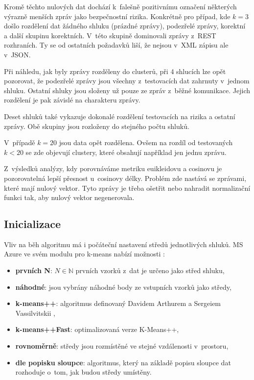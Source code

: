 \documentclass[thesis=M,czech]{FITthesis}[2012/10/20]
\begin{document}
			Kromě těchto nulových dat dochází k~falešně pozitivnímu označení některých výrazně menších zpráv jako bezpečnostní rizika. Konkrétně pro případ, kde $k = 3$ došlo rozdělení dat žádného shluku (prázdné zprávy), podezřelé zprávy, korektní a další skupinu korektních. V~této skupině dominovali zprávy z~REST rozhraních. Ty se od ostatních požadavků liší, že nejsou v~XML zápisu ale v~JSON.
			
			Při náhledu, jak byly zprávy rozděleny do clusterů, při 4 shlucích lze opět pozorovat, že podezřelé zprávy jsou všechny z~testovacích dat zahrnuty v~jednom shluku. Ostatní shluky jsou složeny už pouze ze zpráv z~běžné komunikace. Jejich rozdělení je pak závislé na charakteru zprávy.
			
			Deset shluků také vykazuje dokonalé rozdělení testovacích na rizika a ostatní zprávy. Obě skupiny jsou rozloženy do stejného počtu shluků.
			
			V~případě $ k = 20$ jsou data opět rozdělena. Ovšem na rozdíl od testovaných $k < 20$ se zde objevují clustery, které obsahují například jen jednu zprávu. 
			
			Z~výsledků analýzy, kdy porovnáváme metriku euikleidovu a cosinovu je pozorovatelná lepší přesnost u~cosinovy délky. Problém zde nastává se zprávami, které mají nulový vektor. Tyto zprávy je třeba ošetřit nebo nahradit normalizační funkci tak, aby nulový vektor negenerovala. 			
			
		\subsection{Inicializace}
			Vliv na běh algoritmu má i počáteční nastavení středů jednotlivých shluků. MS Azure ve svém modulu pro k-means nabízí možnosti \cite{MSAzure-kmeans}:
			
			\begin{itemize} 
				\item \textbf{prvních N}: $N \in \mathbb{N} $ prvních vzorků z~dat je určeno jako střed shluku, 
				\item \textbf{náhodné}: jsou vybrány náhodné body ze vstupních vzorků jako středy,
				\item \textbf{k-means++}: algoritmus definovaný Davidem Arthurem a Sergeiem Vassilvitskii \cite{kmeans++},
				\item \textbf{k-means++Fast}: optimalizovaná verze K-Means++,	
				\item \textbf{rovnoměrně}: středy jsou rozmístěné ve stejné vzdálenosti v~prostoru,		
				\item \textbf{dle popisku sloupce}: algoritmus, který na základě popisu sloupce dat rozhoduje o~tom, jak budou středy umístěny.			
			\end{itemize}
		
\end{document}
